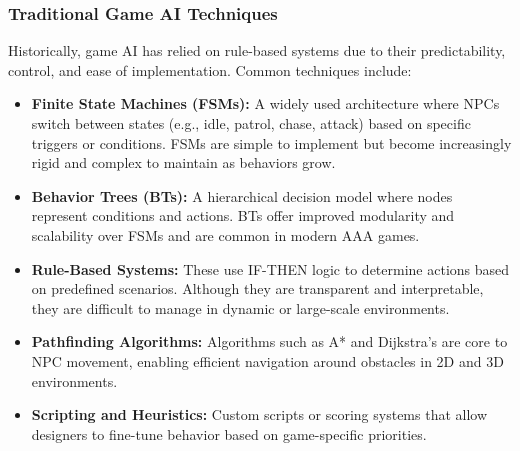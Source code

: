 \documentclass[12pt,oneside,openright,a4paper]{cpe-english-project}
\begin{document}
\subsubsection{Traditional Game AI Techniques}
Historically, game AI has relied on rule-based systems due to their predictability, control, and ease of implementation. Common techniques include:
\begin{itemize}
\item \textbf{Finite State Machines (FSMs):} A widely used architecture where NPCs switch between states (e.g., idle, patrol, chase, attack) based on specific triggers or conditions. FSMs are simple to implement but become increasingly rigid and complex to maintain as behaviors grow.
\item \textbf{Behavior Trees (BTs):} A hierarchical decision model where nodes represent conditions and actions. BTs offer improved modularity and scalability over FSMs and are common in modern AAA games.
\item \textbf{Rule-Based Systems:} These use IF-THEN logic to determine actions based on predefined scenarios. Although they are transparent and interpretable, they are difficult to manage in dynamic or large-scale environments.
\item \textbf{Pathfinding Algorithms:} Algorithms such as A* and Dijkstra’s are core to NPC movement, enabling efficient navigation around obstacles in 2D and 3D environments.
\item \textbf{Scripting and Heuristics:} Custom scripts or scoring systems that allow designers to fine-tune behavior based on game-specific priorities.
\end{itemize}
\end{document}
